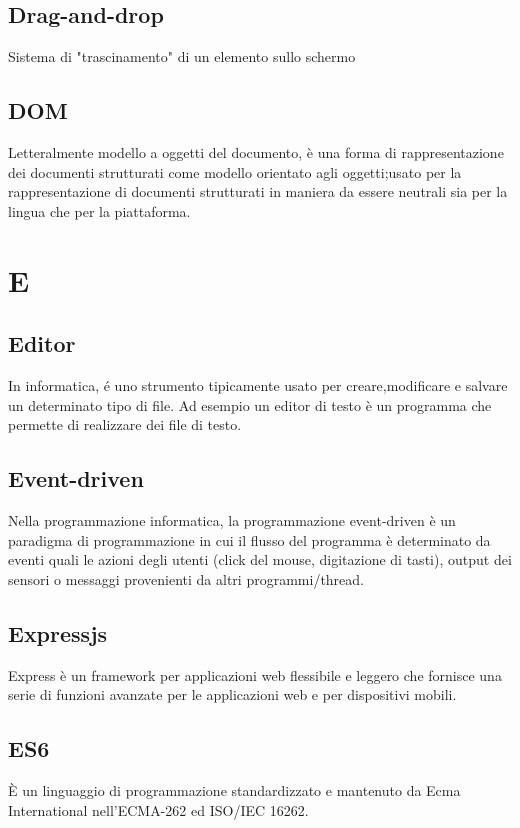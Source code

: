 {{		\subsection{Drag-and-drop}
		Sistema di "trascinamento" di un elemento sullo schermo


		\subsection{DOM}
		Letteralmente modello a oggetti del documento, è una forma di rappresentazione dei documenti strutturati come modello orientato agli oggetti;usato per la rappresentazione di documenti strutturati in maniera da essere neutrali sia per la lingua che per la piattaforma.

\section{E}
	\subsection{Editor}
	In informatica, é uno strumento tipicamente usato per creare,modificare e salvare un determinato tipo di file. Ad esempio un editor di testo è un programma che permette di realizzare dei file di testo.


		\subsection{Event-driven}
		Nella programmazione informatica, la programmazione event-driven è un paradigma di programmazione in cui il flusso del programma è determinato da eventi quali le azioni degli utenti (click del mouse, digitazione di tasti), output dei sensori o messaggi provenienti da altri programmi/thread.


		\subsection{Expressjs}
		Express è un framework per applicazioni web  flessibile e leggero che fornisce una serie di funzioni avanzate per le applicazioni web e per dispositivi mobili.


		\subsection{ES6}
		È un linguaggio di programmazione standardizzato e mantenuto da Ecma International nell'ECMA-262 ed ISO/IEC 16262.

}}
